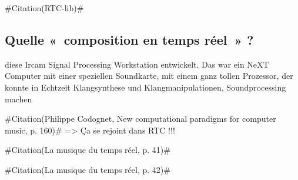 \documentclass[a4paper,12pt]{article}
\newcommand{\guill}[1]{«~#1~»}
\newcommand{\zitat}[2]{\#Citation(#2)\#}
\begin{document}

\zitat{Most of these objects are geared towards straightforward processing of data. By using these specialized objects together in a patch, programming becomes much more clear and easy. Many functions that are often useful in algorithmic composition are provided with this library - therefore the composer could concentrate rather on the composition than the programming aspects.}
{RTC-lib}

\subsection{Quelle \guill{composition en temps réel} ?}

diese Ircam Signal Processing Workstation entwickelt. Das war ein NeXT Computer mit einer speziellen Soundkarte, mit einem ganz tollen Prozessor, der konnte in Echtzeit Klangsynthese und Klangmanipulationen, Soundprocessing machen

\zitat{It is interesting to note that we have with Cage two ways of using randomness for music composition. One, inhreited from Duchamp, is what can be called \emph{internal chance}: randomness is used at composition time to determine the score, which is then written and closed. The other can be called \emph{external chance}: the score is open to real-time chance operation and external perturbation. In that respect, \emph{4'33''} is certainly the best and minimal example of external chance.}
{Philippe Codognet, New computational paradigms for computer music, p. 160}
=> Ça se rejoint dans RTC !!!

\zitat{Mais le temps réel est une notion technologique avant d'être une notion musicale. C'est en fait une illusion. Le temps réel n'existe jamais dans la réalité technologique parce qu'une machine met toujours un certain temps, même si celui-ci est extrêmement bref, pour effectuer ses calculs.}
{La musique du temps réel, p. 41}

\zitat{En musique, on parle de temps réel à partir du moment où le laps de temps entre le début du calcul et la livraison du résultat d'une opération informatique est suffisamment bref pour ne pas être perçu.}
{La musique du temps réel, p. 42}
\end{document}
